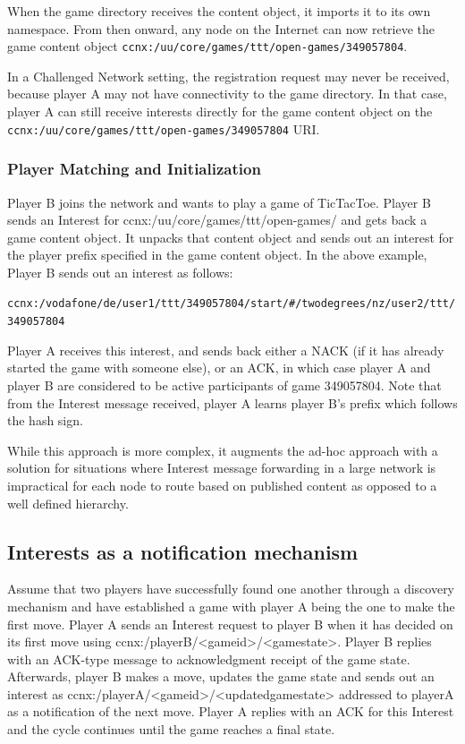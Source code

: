 \documentclass[a4paper,12pt]{report}      %
\begin{document}
When the game directory receives the content object, it imports it to its own namespace. From then
onward, any node on the Internet can now retrieve the game content object
\verb!ccnx:/uu/core/games/ttt/open-games/349057804!.

In a Challenged Network setting, the registration request may never be received, because player A may not have
connectivity to the game directory. In that case, player A can still receive interests directly for the
game content object on the \verb!ccnx:/uu/core/games/ttt/open-games/349057804! URI.

\subsubsection{Player Matching and Initialization}

Player B joins the network and wants to play a game of TicTacToe. Player B sends an Interest for
ccnx:/uu/core/games/ttt/open-games/ and gets back a game content object. It unpacks that content
object and sends out an interest for the player prefix specified in the game content object. In the above
example, Player B sends out an interest as follows:

\verb!ccnx:/vodafone/de/user1/ttt/349057804/start/#/twodegrees/nz/user2/ttt/349057804!

Player A receives this interest, and sends back either a NACK (if it has already started the game with
someone else), or an ACK, in which case player A and player B are considered to be active participants
of game 349057804. Note that from the Interest message received, player A learns player B's prefix
which follows the hash sign.

While this approach is more complex, it augments the ad-hoc approach with a solution for situations
where Interest message forwarding in a large network is impractical for each node to route based on
published content as opposed to a well defined hierarchy.

\subsection{Interests as a notification mechanism}

Assume that two players have successfully found one another through a discovery mechanism and
have established a game with player A being the one to make the first move. Player A sends an Interest
request to player B when it has decided on its first move using ccnx:/playerB/<gameid>/<gamestate>.
Player B replies with an ACK-type message to acknowledgment receipt of the game state. Afterwards,
player B makes a move, updates the game state and sends out an interest as
ccnx:/playerA/<gameid>/<updatedgamestate> addressed to playerA as a notification of the next move.
Player A replies with an ACK for this Interest and the cycle continues until the game reaches a final
state.
\end{document}
